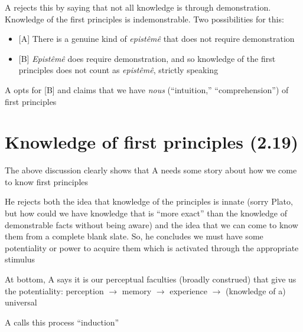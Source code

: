 \documentclass[oneside]{article}
\begin{document}
\noindent A rejects this by saying that not all knowledge is through demonstration. Knowledge of the first principles is indemonstrable. Two possibilities for this:

\begin{itemize}\item{[A] There is a genuine kind of \emph{epist\^{e}m\^{e}} that does not require demonstration}\item{[B] \emph{Epist\^{e}m\^{e}} does require demonstration, and so knowledge of the first principles does not count as \emph{epist\^{e}m\^{e}}, strictly speaking}\end{itemize}

\noindent A opts for [B] and claims that we have \emph{nous} (``intuition,'' ``comprehension'') of first principles

\section*{Knowledge of first principles (2.19)}

\noindent The above discussion clearly shows that A needs some story about how we come to know first principles
\vspace*{2mm}

\noindent He rejects both the idea that knowledge of the principles is innate (sorry Plato, but how could we have knowledge that is ``more exact'' than the knowledge of demonstrable facts without being aware) and the idea that we can come to know them from a complete blank slate. So, he concludes we must have some potentiality or power to acquire them which is activated through the appropriate stimulus
\vspace*{2mm}

\noindent At bottom, A says it is our perceptual faculties (broadly construed) that give us the potentiality: perception $\rightarrow$ memory $\rightarrow$ experience $\rightarrow$ (knowledge of a) universal
\vspace*{2mm}

\noindent A calls this process ``induction''
\end{document}

